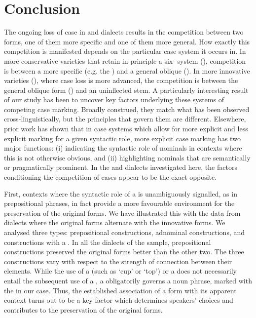 \documentclass[output=paper,colorlinks,citecolor=brown]{langscibook}
\begin{document}
\section{Conclusion}

The ongoing loss of case in  and  dialects results in the competition between two forms, one of them more specific and one of them more general. How exactly this competition is manifested depends on the particular case system it occurs in. In more conservative varieties that retain in principle a six- system (), competition is between a more specific  (e.g. the ) and a general oblique (). In more innovative varieties (), where case loss is more advanced, the competition is between the general oblique form () and an uninflected stem. A particularly interesting result of our study has been to uncover key factors underlying these systems of competing case marking. Broadly construed, they match what has been observed cross-linguistically, but the principles that govern them are different. Elsewhere, prior work has shown that in case systems which allow for more explicit and less explicit marking for a given syntactic role, more explicit case marking has two major functions: (i) indicating the syntactic role of nominals in contexts where this is not otherwise obvious, and (ii) highlighting nominals that are semantically or pragmatically prominent. In the  and  dialects investigated here, the factors conditioning the competition of cases appear to be the exact opposite.

First, contexts where the syntactic role of a  is unambiguously signalled, as in prepositional phrases, in fact provide a more favourable environment for the preservation of the original  forms. We have illustrated this with the data from  dialects where the original   forms alternate with the innovative  forms. We analysed three  types: prepositional constructions, adnominal constructions, and constructions with a . In all the dialects of the sample, prepositional constructions preserved the original  forms better than the other two. The three constructions vary with respect to the strength of connection between their elements. While the use of a  (such as `cup' or `top') or a  does not necessarily entail the subsequent use of a , a  obligatorily governs a noun phrase, marked with the  in our case. Thus, the established association of a form with its apparent context turns out to be a key factor which determines speakers' choices and contributes to the preservation of the original  forms.
\end{document}

